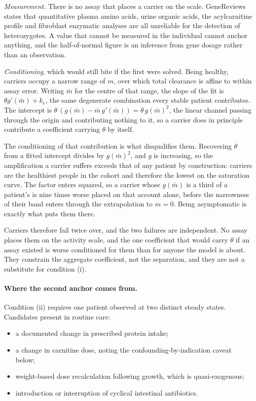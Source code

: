 \documentclass[11pt,a4paper]{article}
\begin{document}
\emph{Measurement.} There is no assay that places a carrier on the scale. GeneReviews
states that quantitative plasma amino acids, urine organic acids, the acylcarnitine
profile and fibroblast enzymatic analyses are all unreliable for the detection of
heterozygotes. A value that cannot be measured in the individual cannot anchor anything,
and the half-of-normal figure is an inference from gene dosage rather than an observation.

\emph{Conditioning}, which would still bite if the first were solved. Being healthy,
carriers occupy a narrow range of $m$, over which total clearance is affine to within assay
error. Writing $\bar m$ for the centre of that range, the slope of the fit is
$\theta g'(\bar m) + k_e$, the same degenerate combination every stable patient contributes.
The intercept is $\theta\,(g(\bar m) - \bar m\, g'(\bar m)) = \theta\, g(\bar m)^2$, the
linear channel passing through the origin and contributing nothing to it, so a carrier does
in principle contribute a coefficient carrying $\theta$ by itself.

The conditioning of that contribution is what disqualifies them. Recovering $\theta$ from a
fitted intercept divides by $g(\bar m)^2$, and $g$ is increasing, so the amplification a
carrier suffers exceeds that of any patient by construction: carriers are the healthiest
people in the cohort and therefore the lowest on the saturation curve. The factor enters
squared, so a carrier whose $g(\bar m)$ is a third of a patient's is nine times worse placed
on that account alone, before the narrowness of their band enters through the extrapolation
to $m = 0$. Being asymptomatic is exactly what puts them there.

Carriers therefore fail twice over, and the two failures are independent. No assay places
them on the activity scale, and the one coefficient that would carry $\theta$ if an assay
existed is worse conditioned for them than for anyone the model is about. They constrain the
aggregate coefficient, not the separation, and they are not a substitute for condition (i).

\paragraph{Where the second anchor comes from.} Condition (ii) requires one patient observed
at two distinct steady states. Candidates present in routine care:
\begin{itemize}[leftmargin=*, itemsep=1pt]
\item a documented change in prescribed protein intake;
\item a change in carnitine dose, noting the confounding-by-indication caveat below;
\item weight-based dose recalculation following growth, which is quasi-exogenous;
\item introduction or interruption of cyclical intestinal antibiotics.
\end{itemize}
\end{document}
